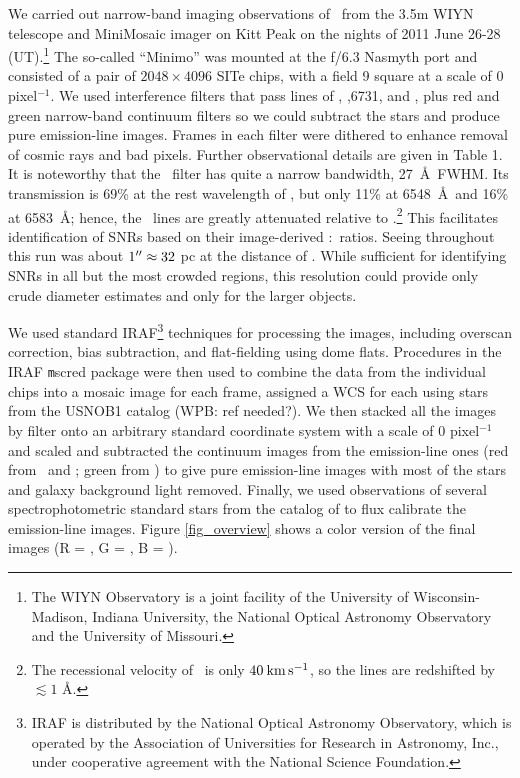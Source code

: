 We carried out narrow-band imaging observations of \gal\ from the 3.5m WIYN telescope and MiniMosaic imager on Kitt Peak on the nights of 2011 June 26-28 (UT).\footnote{The WIYN Observatory is a joint facility of the University of Wisconsin-Madison, Indiana University, the National Optical Astronomy Observatory and the University of Missouri.}  The so-called ``Minimo'' was mounted at the f/6.3 Nasmyth port and consisted of a pair of $2048\times4096$ SITe chips, with a field  9 square at a scale of 0 pixel$^{-1}$.  We used interference filters that pass lines of \ha, \sii {},6731, and \oiii {}, plus red and green narrow-band continuum filters so we could subtract the stars and produce pure emission-line images. Frames in each filter were dithered to enhance removal of cosmic rays and bad pixels.  Further observational details are given in Table 1.  It is noteworthy that the \ha\ filter has quite a narrow bandwidth, 27\ \AA\ FWHM. Its transmission is 69\% at the rest wavelength of \ha, but only 11\% at 6548\ \AA\ and 16\% at 6583\ \AA; hence, the \nii\ lines are greatly attenuated relative to \ha.\footnote{The recessional velocity of \gal\ is only $40 \:\rm{km\,s^{-1}}$, so the lines are redshifted by $\lesssim 1$ \AA.}  This facilitates identification of SNRs based on their image-derived \sii:\ha\ ratios.  Seeing throughout this run was about $1\mbox{$^{\prime\prime}$} \approx 32$ pc at the distance of \gal.  While sufficient for identifying SNRs in all but the most crowded regions, this resolution could provide only crude diameter estimates and only for the larger objects.  


We used standard IRAF\footnote{IRAF is distributed by the National Optical Astronomy Observatory, which is operated by the Association of Universities for Research in Astronomy, Inc., under cooperative agreement with the National Science Foundation.} techniques for processing the images, including overscan correction, bias subtraction, and flat-fielding using dome flats.  Procedures in the IRAF {\texttt mscred} package were then used to combine the data from the individual chips into a mosaic image for each frame, assigned a WCS for each using stars from the USNOB1 catalog (WPB: ref needed?).  We then stacked  all the images by filter onto an arbitrary standard coordinate system with a scale of 0 pixel$^{-1}$ and scaled and subtracted the continuum images from the emission-line ones (red from \ha\ and \sii; green from \oiii) to give pure emission-line images with most of the stars and galaxy background light removed.  Finally, we used observations of several spectrophotometric standard stars from the catalog of \citet{massey88} to flux calibrate the emission-line images.  Figure \ref{fig_overview} shows a color version of the final images (R = \ha, G = \sii, B = \oiii).

